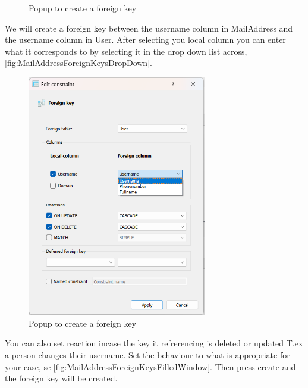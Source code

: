\documentclass[a4paper,11pt,oneside]{article}
\begin{document}
\begin{sloppypar}
\begin{figure}[!htb]
  \caption{Popup to create a foreign key}
  \label{fig:MailAddressForeignKeysBlankWindow}
\end{figure}
We will create a foreign key between the username column in MailAddress and the username column in User. After selecting you local column you can enter what it corresponds to by selecting it in the drop down list across, \autoref{fig:MailAddressForeignKeysDropDown}. 
\begin{figure}[!htb]
  \centering
  \includegraphics[width=0.7\textwidth]{sqlitestudio/create_foreign_key/foreign_key_dropdown_menu.png}
  \caption{Popup to create a foreign key}
  \label{fig:MailAddressForeignKeysDropDown}
\end{figure}
You can also set reaction incase the key it refrerencing is deleted or updated T.ex a person changes their username. Set the behaviour to what is appropriate for your case, se \autoref{fig:MailAddressForeignKeysFilledWindow}. Then press create and the foreign key will be created.
\begin{figure}[!htb]
  \centering

\end{figure}
\end{sloppypar}
\end{document}
